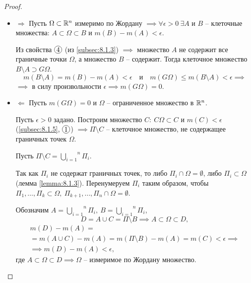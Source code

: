 \begin{proof}\leavevmode
    \begin{itemize}
        \item $ \boxed{\Rightarrow} $ Пусть $ \Omega \subset \mathbb{R}^n $ измеримо по Жордану $ \implies \forall \epsilon > 0 \ \exists A $ и $ B $ -- клеточные множества: $ A \subset \Omega \subset B $ и $ m(B) - m(A) < \epsilon $.

              Из свойства $ \circled{4} $ (из \ref{subsec:8.1.3}) $ \implies $ множество $ A $ не содержит все граничные точки $ \Omega $, а множество $ B $ -- содержит. Тогда клеточное множество $ B \setminus A \supset G\Omega $.
              \[
                  m(B\setminus A) = m(B) - m(A) < \epsilon \quad \text{и} \quad m(G\Omega) \leqslant m(B\setminus A) < \epsilon \implies
              \]
              $ \implies $ в силу произвольности $ \epsilon \implies m(G\Omega) = 0 $.

        \item $ \boxed{\Leftarrow} $ Пусть $ m(G\Omega) = 0 $ и $ \Omega $ -- ограниченное множество в $ \mathbb{R}^n $.

              Пусть $ \epsilon > 0 $ задано. Построим множество $ C: \ C\Omega \subset C $ и $ m(C) < \epsilon $ (\ref{subsec:8.1.5}, $ \circled{1} $) $ \implies \Pi \setminus C $ -- клеточное множество, не содержащее граничных точек $ \Omega $.

              Пусть $ \Pi \setminus C = \overset{n}{\underset{i=1}{\bigcup}}\Pi_i $.

              Так как $ \Pi_i $ не содержат граничных точек, то либо $ \Pi_i \cap \Omega = \emptyset $, либо $ \Pi_i \subset \Omega $ (лемма \ref{lemma:8.1.3}). Перенумеруем $ \Pi_i $ таким образом, чтобы $ \Pi_1,\ldots,\Pi_k \subset \Omega, \ \Pi_{k+1},\ldots,\Pi_n \cap \Omega = \emptyset $.

              Обозначим $ A = \overset{n}{\underset{i=1}{\bigcup}}\Pi_i, \ B = \overset{n}{\underset{i=1}{\bigcup}} \Pi_i $,
              \[
                  D = A \cup C = \Pi \setminus B \implies A \subset \Omega \subset D,
              \]
              \begin{multline*}
                  m(D) - m(A) = \\
                  = m(A \cup C) - m(A) = m(\Pi\setminus B) - m(A) = m(C) < \epsilon \implies \\
                  \implies m(D) - m(A) < \epsilon,
              \end{multline*}
              где $ A \subset \Omega \subset D \implies \Omega $ -- измеримое по Жордану множество.
    \end{itemize}
\end{proof}